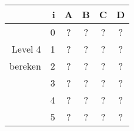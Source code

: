 \begin{tabular}{ rr| c|c|c|c}\hline\hline
     & i & \textbf{A} & \textbf{B} & \textbf{C} & \textbf{D}\\\hline

&0&?&?&?&?\\
Level 4 & 1&?&?&?&?\\
bereken &2&?&?&?&?\\
&3&?&?&?&?\\
&4&?&?&?&?\\
&5&?&?&?&?\\
\hline\end{tabular}\par\ \newline

